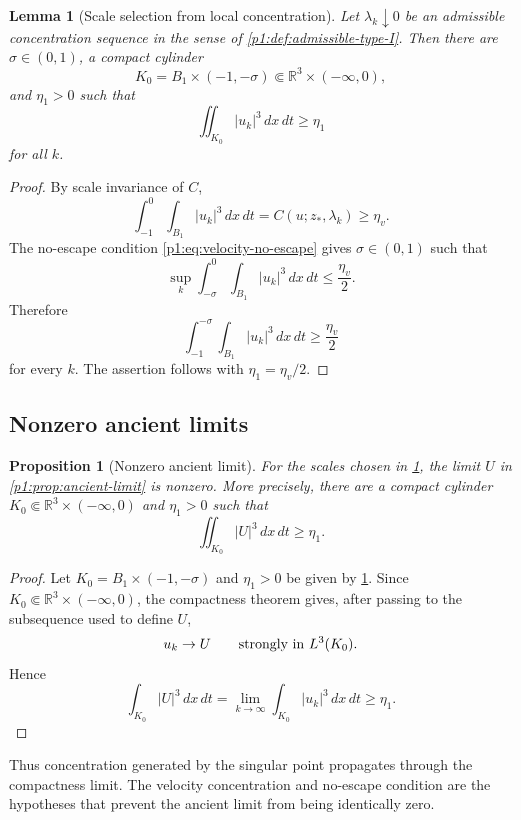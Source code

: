 \documentclass[11pt]{amsart}
\theoremstyle{plain}
\newtheorem{lemma}[lemma]{Lemma}
\newtheorem{proposition}[proposition]{Proposition}
\theoremstyle{definition}
\theoremstyle{remark}
\numberwithin{equation}{section}
\newcommand{\R}{\mathbb R}
\begin{document}
\begin{lemma}[Scale selection from local concentration]\label{p1:lem:scale-selection}
Let \(\lambda_k\downarrow0\) be an admissible concentration sequence in the
sense of \cref{p1:def:admissible-type-I}.  Then there are
\(\sigma\in(0,1)\), a compact cylinder
\[
   K_0=B_1\times(-1,-\sigma)\Subset\R^3\times(-\infty,0),
\]
and \(\eta_1>0\) such that
\begin{equation}\label{p1:eq:selected-lower-bound}
   \iint_{K_0}|u_k|^3\,dx\,dt\ge\eta_1
\end{equation}
for all \(k\).
\end{lemma}

\begin{proof}
By scale invariance of \(C\),
\[
   \int_{-1}^{0}\int_{B_1}|u_k|^3\,dx\,dt
   =
   C(u;z_*,\lambda_k)\ge\eta_v .
\]
The no-escape condition \eqref{p1:eq:velocity-no-escape} gives
\(\sigma\in(0,1)\) such that
\[
   \sup_k\int_{-\sigma}^{0}\int_{B_1}|u_k|^3\,dx\,dt
   \le \frac{\eta_v}{2}.
\]
Therefore
\[
   \int_{-1}^{-\sigma}\int_{B_1}|u_k|^3\,dx\,dt
   \ge \frac{\eta_v}{2}
\]
for every \(k\).  The assertion follows with
\(\eta_1=\eta_v/2\).
\end{proof}

\subsection{Nonzero ancient limits}

\begin{proposition}[Nonzero ancient limit]\label{p1:prop:nonzero}
For the scales chosen in \cref{p1:lem:scale-selection}, the limit \(U\) in
\cref{p1:prop:ancient-limit} is nonzero.  More precisely, there are a compact
cylinder \(K_0\Subset\R^3\times(-\infty,0)\) and \(\eta_1>0\) such that
\[
   \iint_{K_0}|U|^3\,dx\,dt\ge\eta_1 .
\]
\end{proposition}

\begin{proof}
Let \(K_0=B_1\times(-1,-\sigma)\) and \(\eta_1>0\) be given by
\cref{p1:lem:scale-selection}.  Since
\(K_0\Subset\R^3\times(-\infty,0)\), the compactness theorem gives, after
passing to the subsequence used to define \(U\),
\[
   u_k\to U\qquad\hbox{strongly in }L^3(K_0).
\]
Hence
\[
   \int_{K_0}|U|^3\,dx\,dt
   =
   \lim_{k\to\infty}\int_{K_0}|u_k|^3\,dx\,dt
   \ge\eta_1 .
\]
\end{proof}

Thus concentration generated by the singular point propagates through the
compactness limit.  The velocity concentration and no-escape condition are the
hypotheses that prevent the ancient limit from being identically zero.
\end{document}
